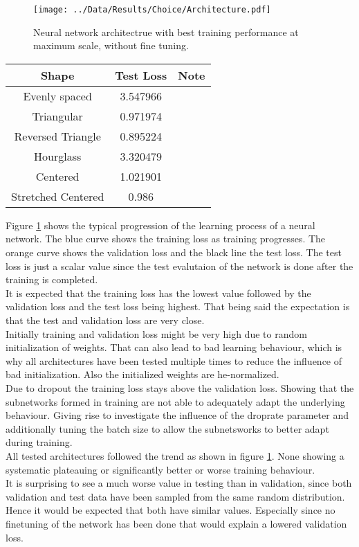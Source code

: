 			\begin{figure}
				\centering
				\texttt{[image: ../Data/Results/Choice/Architecture.pdf]}
				\caption{Neural network architectrue with best training performance at maximum scale, without fine tuning.}
				\label{Fig:ResArch}
			\end{figure}
			
			\begin{tabularx}{\textwidth}{c|c|X}
				Shape & Test Loss & Note \\
				\hline
				Evenly spaced & 3.547966 & \\
				Triangular & 0.971974 & \\
				Reversed Triangle & 0.895224 & \\
				Hourglass & 3.320479 & \\
				Centered & 1.021901 & \\
				Stretched Centered& 0.986 & \\
			\end{tabularx}
			Figure \ref{Fig:ResArch} shows the typical progression of the learning process of a neural network. The blue curve shows the training loss as training progresses. The orange curve shows the validation loss and the black line the test loss. The test loss is just a scalar value since the test evalutaion of the network is done after the training is completed.\\
			It is expected that the training loss has the lowest value followed by the validation loss and the test loss being highest. That being said the expectation is that the test and validation loss are very close.\\
			Initially training and validation loss might be very high due to random initialization of weights. That can also lead to bad learning behaviour, which is why all architectures have been tested multiple times to reduce the influence of bad initialization. Also the initialized weights are he-normalized.\\
			Due to dropout the training loss stays above the validation loss. Showing that the subnetworks formed in training are not able to adequately adapt the underlying behaviour. Giving rise to investigate the influence of the droprate parameter and additionally tuning the batch size to allow the subnetsworks to better adapt during training.\\
			All tested architectures followed the trend as shown in figure \ref{Fig:ResArch}. None showing a systematic plateauing or significantly better or worse training behaviour.\\
			It is surprising to see a much worse value in testing than in validation, since both validation and test data have been sampled from the same random distribution. Hence it would be expected that both have similar values. Especially since no finetuning of the network has been done that would explain a lowered validation loss.
			
